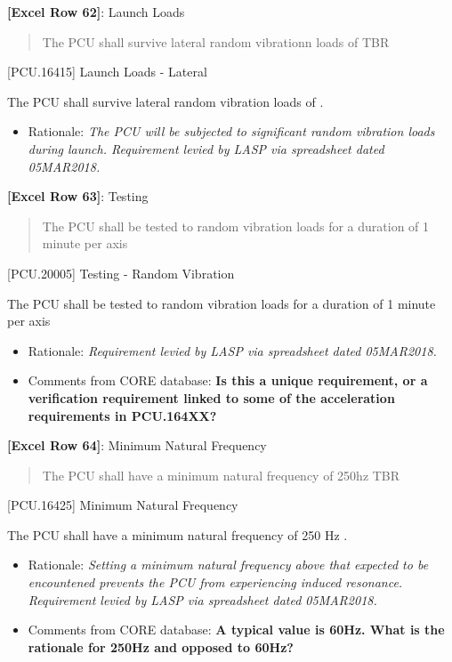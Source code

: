 \textbf{[Excel Row 62]}: Launch Loads

\begin{quote}
The PCU shall survive lateral random vibrationn loads of TBR
\end{quote}

[PCU.16415] Launch Loads - Lateral

The PCU shall survive lateral random vibration loads of .

\begin{itemize}
\item{} Rationale: \emph{The PCU will be subjected to significant random vibration loads during launch. Requirement levied by LASP via spreadsheet dated 05MAR2018.}

\end{itemize}

\textbf{[Excel Row 63]}: Testing

\begin{quote}
The PCU shall be tested to random vibration loads for a duration of 1 minute per axis
\end{quote}

[PCU.20005] Testing - Random Vibration

The PCU shall be tested to random vibration loads for a duration of 1 minute per axis

\begin{itemize}
\item{} Rationale: \emph{Requirement levied by LASP via spreadsheet dated 05MAR2018.}

\item{} Comments from CORE database: \textbf{Is this a unique requirement, or a verification requirement linked to some of the acceleration requirements in PCU.164XX?}

\end{itemize}

\textbf{[Excel Row 64]}: Minimum Natural Frequency

\begin{quote}
The PCU shall have a minimum natural frequency of 250hz TBR
\end{quote}

[PCU.16425] Minimum Natural Frequency

The PCU shall have a minimum natural frequency of 250 Hz .

\begin{itemize}
\item{} Rationale: \emph{Setting a minimum natural frequency above that expected to be encountened prevents the PCU from experiencing induced resonance. Requirement levied by LASP via spreadsheet dated 05MAR2018.}

\item{} Comments from CORE database: \textbf{A typical value is 60Hz. What is the rationale for 250Hz and opposed to 60Hz?}

\end{itemize}

